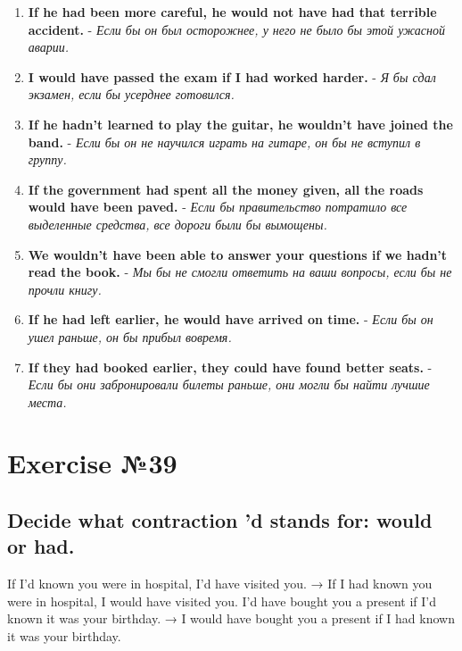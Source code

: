 \begin{enumerate}
      \item \textbf{If he had been more careful, he would not have had that terrible accident.} - \textit{Если бы он был осторожнее, у него не было бы этой ужасной аварии.}
      \item \textbf{I would have passed the exam if I had worked harder.} - \textit{Я бы сдал экзамен, если бы усерднее готовился.}
      \item \textbf{If he hadn’t learned to play the guitar, he wouldn’t have joined the band.} - \textit{Если бы он не научился играть на гитаре, он бы не вступил в группу.}
      \item \textbf{If the government had spent all the money given, all the roads would have been paved.} - \textit{Если бы правительство потратило все выделенные средства, все дороги были бы вымощены.}
      \item \textbf{We wouldn’t have been able to answer your questions if we hadn’t read the book.} - \textit{Мы бы не смогли ответить на ваши вопросы, если бы не прочли книгу.}
      \item \textbf{If he had left earlier, he would have arrived on time.} - \textit{Если бы он ушел раньше, он бы прибыл вовремя.}
      \item \textbf{If they had booked earlier, they could have found better seats.} - \textit{Если бы они забронировали билеты раньше, они могли бы найти лучшие места.}
\end{enumerate}

\section{Exercise №39}
\subsection*{Decide what contraction ’d stands for: would or had.}
If I'd known you were in hospital, I'd have visited you. → If I had known you were in hospital, I would have visited you. I'd have bought you a present if I'd known it was your birthday. → I would have bought you a present if I had known it was your birthday.

